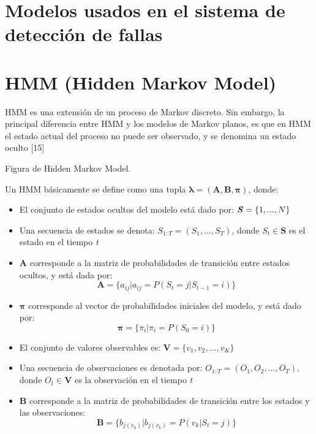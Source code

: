 \section{Modelos usados en el sistema de detección de fallas} %
\label{section2.5}

\section*{HMM (Hidden Markov Model) }

HMM es una extensi\'on de un proceso de Markov discreto. Sin embargo, la principal diferencia entre HMM y los modelos de Markov planos, es que en HMM el estado actual del proceso no puede ser observado, y se denomina un estado oculto [15]

Figura de Hidden Markov Model.

Un HMM b\'asicamente se define como una tupla $\boldsymbol\lambda = (\textbf{A},\textbf{B},\boldsymbol\pi)$, donde:

\begin{itemize}

\item El conjunto de estados ocultos del modelo est\'a dado por: $\textbf{\textit{S}}=\lbrace 1,...,N \rbrace$

\item Una secuencia de estados se denota: $S_{1:T}=(S_{1},...,S_{T})$, donde $S_{t} \in \textbf{S}$ es el estado en el tiempo \textit{t}

\item \textbf{A} corresponde a la matriz de probabilidades de transici\'on entre estados ocultos, y est\'a dada por:
\begin{equation}
\textbf{A} = \lbrace a_{ij} \vert a_{ij} = P(S_{t} = j \vert S_{t-1} = i) \rbrace
\end{equation}

\item $\boldsymbol\pi$ corresponde al vector de probabilidades iniciales del modelo, y est\'a dado por: 
\begin{equation}
\boldsymbol\pi = \lbrace \pi_{i} \vert \pi_{i} = P(S_{0} = i) \rbrace
\end{equation}

\item El conjunto de valores observables es: $\textbf{V} = \lbrace v_{1}, v_{2},...,v_{K} \rbrace$

\item Una secuencia de observaciones es denotada por: $O_{1:T} = (O_{1},O_{2},...,O_{T})$, donde $O_{t} \in \textbf{V}$ es la observaci\'on en el tiempo \textit{t}

\item \textbf{B} corresponde a la matriz de probabilidades de transici\'on entre los estados y las observaciones:
\begin{equation}
\textbf{B} = \lbrace b_{j(v_{k})} \vert b_{j(v_{k})} = P(v_{k} \vert S_{t} = j) \rbrace
\end{equation}

\end{itemize}


